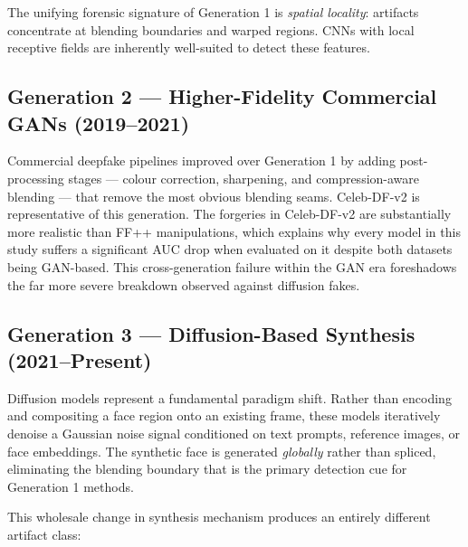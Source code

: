 \documentclass[conference]{IEEEtran}
\begin{document}
The unifying forensic signature of Generation 1 is \emph{spatial locality}: artifacts concentrate at blending boundaries and warped regions. CNNs with local receptive fields are inherently well-suited to detect these features.

\subsection{Generation 2 --- Higher-Fidelity Commercial GANs (2019--2021)}

Commercial deepfake pipelines improved over Generation 1 by adding post-processing stages --- colour correction, sharpening, and compression-aware blending --- that remove the most obvious blending seams. Celeb-DF-v2 \cite{li2020celeb} is representative of this generation. The forgeries in Celeb-DF-v2 are substantially more realistic than FF++ manipulations, which explains why every model in this study suffers a significant AUC drop when evaluated on it despite both datasets being GAN-based. This cross-generation failure within the GAN era foreshadows the far more severe breakdown observed against diffusion fakes.

\subsection{Generation 3 --- Diffusion-Based Synthesis (2021--Present)}

Diffusion models represent a fundamental paradigm shift. Rather than encoding and compositing a face region onto an existing frame, these models iteratively denoise a Gaussian noise signal conditioned on text prompts, reference images, or face embeddings. The synthetic face is generated \emph{globally} rather than spliced, eliminating the blending boundary that is the primary detection cue for Generation 1 methods.

This wholesale change in synthesis mechanism produces an entirely different artifact class:
\end{document}

